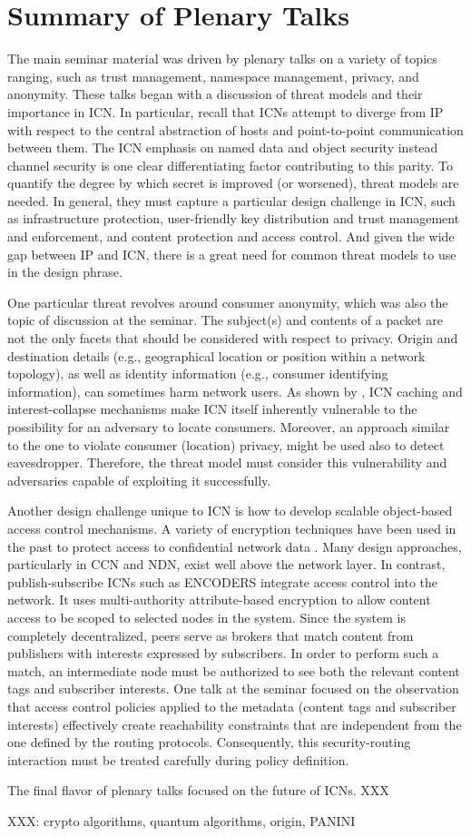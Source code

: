 \section{Summary of Plenary Talks} \label{sec:talks}
The main seminar material was driven by plenary talks on a variety of topics
ranging, such as trust management, namespace management, privacy, and anonymity.
These talks began with a discussion of threat models and their importance in ICN.
In particular, recall that ICNs attempt to diverge from IP with respect
to the central abstraction of hosts and point-to-point communication between
them. The ICN emphasis on named data and object security instead channel security
is one clear differentiating factor contributing to this parity. To quantify
the degree by which secret is improved (or worsened), threat models are needed.
In general, they must capture a particular design challenge in ICN, such as
infrastructure protection, user-friendly key distribution and trust management
and enforcement, and content protection and access control. And given the wide gap
between IP and ICN, there is a great need for common threat models to use
in the design phrase.

One particular threat revolves around consumer anonymity, which was also
the topic of discussion at the seminar. The subject(s) and contents
of a packet are not the only facets that should be considered with respect to privacy.
Origin and destination details (e.g., geographical location or position within a network
topology), as well as identity information (e.g., consumer identifying information),
can sometimes harm network users. As shown by \cite{}, ICN caching and interest-collapse mechanisms make
ICN itself inherently vulnerable to the possibility for an adversary to locate
consumers. Moreover, an approach similar to the one to violate consumer
(location) privacy, might be used also to detect eavesdropper. Therefore, the
threat model must consider this vulnerability and adversaries capable of exploiting
it successfully.

Another design challenge unique to ICN is how to develop scalable object-based
access control mechanisms. A variety of encryption techniques have been used
in the past to protect access to confidential network data \cite{references}.
Many design approaches, particularly in CCN and NDN, exist well above the network
layer. In contrast, publish-subscribe ICNs such as ENCODERS \cite{} integrate
access control into the network. It uses multi-authority attribute-based encryption
to allow content access to be scoped to selected nodes in the system. Since the
system is completely decentralized, peers serve as brokers that match content from
publishers with interests expressed by subscribers. In order to perform such a match,
an intermediate node must be authorized to see both the relevant content tags and
subscriber interests. One talk at the seminar focused on the observation that
access control policies applied to the metadata (content tags and subscriber interests)
effectively create reachability constraints that are independent from the one defined by
the routing protocols. Consequently, this security-routing interaction must be
treated carefully during policy definition.

The final flavor of plenary talks focused on the future of ICNs. XXX

XXX: crypto algorithms, quantum algorithms, origin, PANINI
